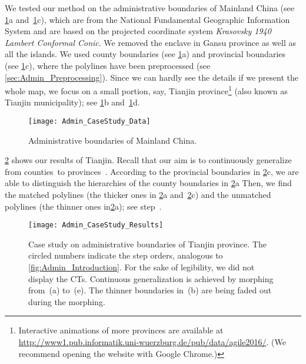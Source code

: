 We tested our method 
on the administrative boundaries of Mainland China
(see \figs\ref{fig:Admin_Data}a and~\ref{fig:Admin_Data}c),
which are from 
the National Fundamental Geographic Information System 
and are based on the projected coordinate system 
\emph{Krasovsky 1940 Lambert Conformal Conic}. 
We removed the enclave in Gansu province 
as well as all the islands.
%
We used county boundaries (see \fig\ref{fig:Admin_Data}a)
and provincial boundaries (see \fig\ref{fig:Admin_Data}c),
where the polylines have been preprocessed
(see \sect\ref{sec:Admin_Preprocessing}).
%
Since we can hardly see the details
if we present the whole map, 
we focus on a small portion, say, 
Tianjin province\footnote{Interactive animations 
of more	provinces are available at
\url{http://www1.pub.informatik.uni-wuerzburg.de/pub/data/agile2016/}.
(We recommend opening the website with Google Chrome.)}
(also known as Tianjin municipality);
see \figs\ref{fig:Admin_Data}b and~\ref{fig:Admin_Data}d.

\begin{figure}[tb]
	\centering
	\texttt{[image: Admin\_CaseStudy\_Data]}
	\caption{Administrative boundaries of Mainland China.}
	\label{fig:Admin_Data}
\end{figure}

\fig\ref{fig:Admin_CaseStudy} shows our results of Tianjin.
Recall that our aim is to continuously generalize 
from counties~\ml to provinces~\ms. 
According to the provincial boundaries in
\fig\ref{fig:Admin_CaseStudy}c, we are able to
distinguish the hierarchies of the county boundaries in
\fig\ref{fig:Admin_CaseStudy}a 
Then, we find the matched polylines 
(the thicker ones in \figs\ref{fig:Admin_CaseStudy}a 
and~\ref{fig:Admin_CaseStudy}c) and the unmatched polylines 
(the thinner ones in\fig\ref{fig:Admin_CaseStudy}a); see 
step~.

\begin{figure}[tb] 
	\centering
	\texttt{[image: Admin\_CaseStudy\_Results]}
	\caption{Case study on administrative boundaries of Tianjin province.
		The circled numbers indicate the step orders, 
		analogous to \fig\ref{fig:Admin_Introduction}. 
		For the sake of legibility, we did not display 
		the CTs. 
		Continuous generalization is achieved by 
		morphing from~(a) to~(e).  
		The thinner boundaries in~(b) are being faded out
		during the morphing.}
	\label{fig:Admin_CaseStudy}
\end{figure}

